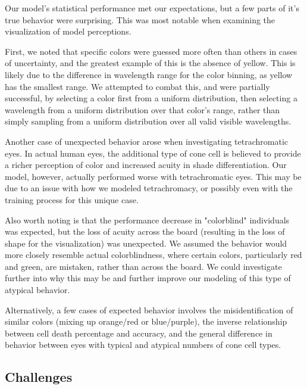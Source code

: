 \documentclass[titlepage]{article}
\begin{document}
Our model's statistical performance met our expectations, but a few parts of it's true behavior were surprising. This was most notable when examining the visualization of model perceptions. 

\bigskip

First, we noted that specific colors were guessed more often than others in cases of uncertainty, and the greatest example of this is the absence of yellow. This is likely due to the difference in wavelength range for the color binning, as yellow has the smallest range. We attempted to combat this, and were partially successful, by selecting a color first from a uniform distribution, then selecting a wavelength from a uniform distribution over that color's range, rather than simply sampling from a uniform distribution over all valid visible wavelengths. 

\bigskip

Another case of unexpected behavior arose when investigating tetrachromatic eyes. In actual human eyes, the additional type of cone cell is believed to provide a richer perception of color and increased acuity in shade differentiation. Our model, however, actually performed worse with tetrachromatic eyes. This may be due to an issue with how we modeled tetrachromacy, or possibly even with the training process for this unique case. 

\bigskip

Also worth noting is that the performance decrease in "colorblind" individuals was expected, but the loss of acuity across the board (resulting in the loss of shape for the visualization) was unexpected. We assumed the behavior would more closely resemble actual colorblindness, where certain colors, particularly red and green, are mistaken, rather than across the board. We could investigate further into why this may be and further improve our modeling of this type of atypical behavior. 

\bigskip

Alternatively, a few cases of expected behavior involves the misidentification of similar colors (mixing up orange/red or blue/purple), the inverse relationship between cell death percentage and accuracy, and the general difference in behavior between eyes with typical and atypical numbers of cone cell types. 

\subsection{Challenges}
\end{document}
